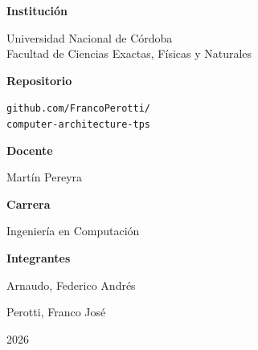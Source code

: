 \begin{titlepage}
  \begin{minipage}[t]{0.45\textwidth}
    \raggedright
    {\color{technicalviolet}\bfseries Institución\par}
    \vspace{0.18cm}
    Universidad Nacional de Córdoba\\
    Facultad de Ciencias Exactas, Físicas y Naturales\\[0.55cm]
    {\color{technicalviolet}\bfseries Repositorio\par}
    \vspace{0.18cm}
    \small\texttt{github.com/FrancoPerotti/}\\
    \texttt{computer-architecture-tps}
  \end{minipage}
  \hfill
  \begin{minipage}[t]{0.43\textwidth}
    \raggedright
    {\color{technicalviolet}\bfseries Docente\par}
    \vspace{0.18cm}
    Martín Pereyra\\[0.55cm]
    {\color{technicalviolet}\bfseries Carrera\par}
    \vspace{0.18cm}
    Ingeniería en Computación
  \end{minipage}

  \vspace{0.85cm}

  \begin{minipage}{0.92\textwidth}
    {\color{technicalviolet}\bfseries Integrantes\par}
    \vspace{0.2cm}
    \small
    \begin{minipage}[t]{0.46\linewidth}
      \raggedright Arnaudo, Federico Andrés
    \end{minipage}
    \hfill
    \begin{minipage}[t]{0.46\linewidth}
      \raggedright Perotti, Franco José
    \end{minipage}
  \end{minipage}

  \vspace{0.65cm}
  {\Large 2026\par}

\end{titlepage}
